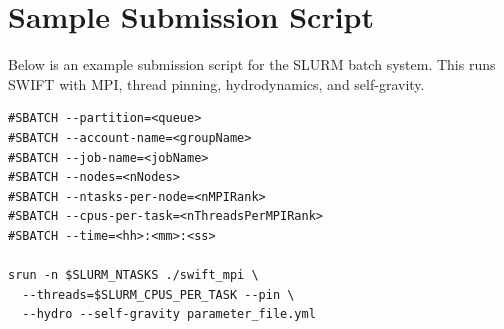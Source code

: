 \section{Sample Submission Script}

Below is an example submission script for the SLURM batch system. This runs
SWIFT with MPI, thread pinning, hydrodynamics, and self-gravity.

\begin{lstlisting}[style=codeblock]
#SBATCH --partition=<queue>
#SBATCH --account-name=<groupName>
#SBATCH --job-name=<jobName>
#SBATCH --nodes=<nNodes>
#SBATCH --ntasks-per-node=<nMPIRank>
#SBATCH --cpus-per-task=<nThreadsPerMPIRank>
#SBATCH --time=<hh>:<mm>:<ss>

srun -n $SLURM_NTASKS ./swift_mpi \
  --threads=$SLURM_CPUS_PER_TASK --pin \
  --hydro --self-gravity parameter_file.yml
\end{lstlisting}

